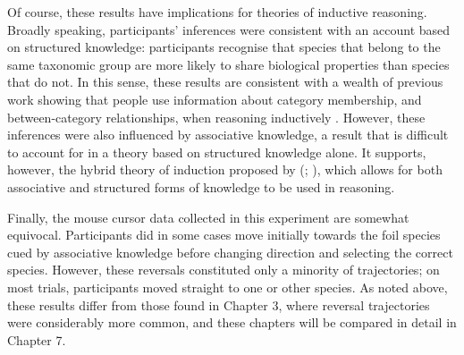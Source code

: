 Of course, these results have implications for theories of inductive reasoning.
Broadly speaking, participants' inferences were consistent
with an account based on structured knowledge:
participants recognise that species that belong to the same taxonomic group
are more likely to share biological properties
than species that do not.
In this sense, these results are consistent with
a wealth of previous work showing that people use
information about category membership,
and between-category relationships,
when reasoning inductively
\citep{Gelman1986,Murphy2010,Murphy2004,Murphy1985,Rips1975,Osherson1990}.
However, these inferences were also influenced by associative knowledge,
a result that is difficult to account for in a theory
based on structured knowledge alone.
It supports, however, the hybrid theory of induction
proposed by
\citeauthor{Bright2014a} (\citeyear{Bright2014a}; \citealp{Crisp-Bright2010}),
which allows for both associative and structured forms of knowledge
to be used in reasoning.

Finally, the mouse cursor data collected in this experiment are somewhat equivocal.
Participants did in some cases
move initially towards the foil species cued by associative knowledge
before changing direction and selecting the correct species.
However, these reversals constituted only a minority of trajectories;
on most trials, participants moved straight to one or other species.
As noted above, these results differ from those found in Chapter 3,
where reversal trajectories were considerably more common,
and these chapters will be compared in detail in Chapter 7.















